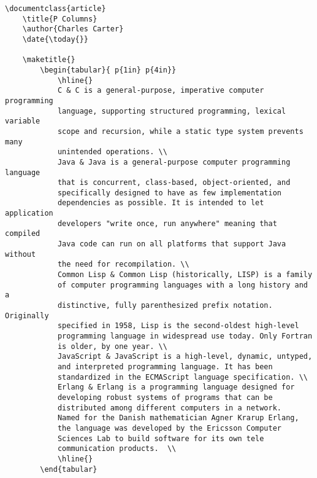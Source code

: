         \begin{verbatim}
\documentclass{article}
    \title{P Columns}
    \author{Charles Carter}
    \date{\today{}}
 
    \maketitle{}
        \begin{tabular}{ p{1in} p{4in}}
            \hline{}
            C & C is a general-purpose, imperative computer programming 
            language, supporting structured programming, lexical variable 
            scope and recursion, while a static type system prevents many 
            unintended operations. \\
            Java & Java is a general-purpose computer programming language 
            that is concurrent, class-based, object-oriented, and 
            specifically designed to have as few implementation 
            dependencies as possible. It is intended to let application 
            developers "write once, run anywhere" meaning that compiled 
            Java code can run on all platforms that support Java without 
            the need for recompilation. \\
            Common Lisp & Common Lisp (historically, LISP) is a family 
            of computer programming languages with a long history and a 
            distinctive, fully parenthesized prefix notation. Originally 
            specified in 1958, Lisp is the second-oldest high-level 
            programming language in widespread use today. Only Fortran 
            is older, by one year. \\
            JavaScript & JavaScript is a high-level, dynamic, untyped, 
            and interpreted programming language. It has been 
            standardized in the ECMAScript language specification. \\
            Erlang & Erlang is a programming language designed for 
            developing robust systems of programs that can be 
            distributed among different computers in a network. 
            Named for the Danish mathematician Agner Krarup Erlang, 
            the language was developed by the Ericsson Computer 
            Sciences Lab to build software for its own tele
            communication products.  \\
            \hline{}
        \end{tabular}
    
        \end{verbatim}

